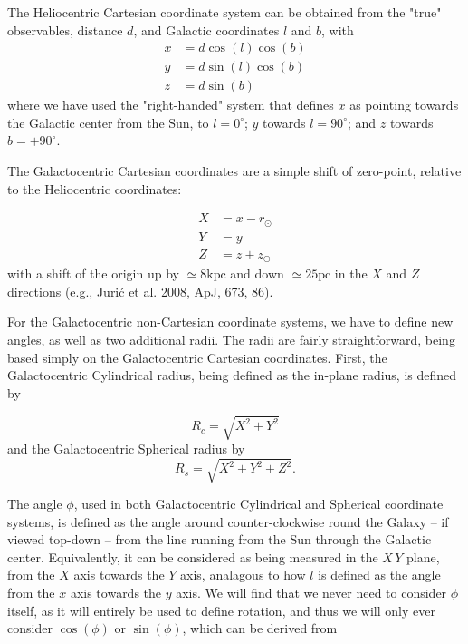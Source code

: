 \documentclass[fleqn,usenatbib]{mnras}
\begin{document}
The Heliocentric Cartesian coordinate system can be obtained from the "true" observables, distance $d$, and Galactic coordinates $l$ and $b$, with
\begin{align}
    x &= d \cos(l) \cos(b) \\
    y &= d \sin(l) \cos(b) \\
    z &= d \sin(b)
\end{align}
where we have used the "right-handed" system that defines $x$ as pointing towards the Galactic center from the Sun, to $l = 0^\circ$; $y$ towards $l = 90^\circ$; and $z$ towards $b = +90^\circ$.

The Galactocentric Cartesian coordinates are a simple shift of zero-point, relative to the Heliocentric coordinates:

\begin{align}
    X &= x - r_\odot \\
    Y & = y \\
    Z &= z + z_\odot
\end{align}
with a shift of the origin up by $\simeq 8 \mathrm{kpc}$ and down $\simeq 25 \mathrm{pc}$ in the $X$ and $Z$ directions (e.g., Juri\'{c} et al. 2008, ApJ, 673, 86).

For the Galactocentric non-Cartesian coordinate systems, we have to define new angles, as well as two additional radii. The radii are fairly straightforward, being based simply on the Galactocentric Cartesian coordinates. First, the Galactocentric Cylindrical radius, being defined as the in-plane radius, is defined by

\begin{equation}
    R_c = \sqrt{X^2 + Y^2}
\end{equation}
and the Galactocentric Spherical radius by
\begin{equation}
    R_s = \sqrt{X^2 + Y^2 + Z^2}.
\end{equation}

The angle $\phi$, used in both Galactocentric Cylindrical and Spherical coordinate systems, is defined as the angle around counter-clockwise round the Galaxy -- if viewed top-down -- from the line running from the Sun through the Galactic center. Equivalently, it can be considered as being measured in the $X\,Y$ plane, from the $X$ axis towards the $Y$ axis, analagous to how $l$ is defined as the angle from the $x$ axis towards the $y$ axis. We will find that we never need to consider $\phi$ itself, as it will entirely be used to define rotation, and thus we will only ever consider $\cos(\phi)$ or $\sin(\phi)$, which can be derived from
\end{document}
